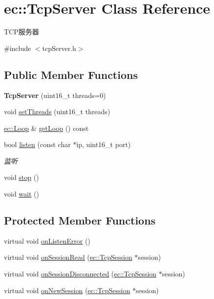 \hypertarget{classec_1_1TcpServer}{\section{ec\-:\-:Tcp\-Server Class Reference}
\label{classec_1_1TcpServer}
}


T\-C\-P服务器  




{\ttfamily \#include $<$tcp\-Server.\-h$>$}

\subsection*{Public Member Functions}
\begin{DoxyCompactItemize}
\item 
\hypertarget{classec_1_1TcpServer_acda2f66f003a4203c17886c3d70c1c77}{{\bfseries Tcp\-Server} (uint16\-\_\-t threads=0)}\label{classec_1_1TcpServer_acda2f66f003a4203c17886c3d70c1c77}

\item 
void \hyperlink{classec_1_1TcpServer_a5bb66fcd67ba08031fc65c7e2ea7220d}{set\-Threads} (uint16\-\_\-t threads)
\item 
\hyperlink{classec_1_1Loop}{ec\-::\-Loop} \& \hyperlink{classec_1_1TcpServer_a9249823c7fb037626df45335dad1c506}{get\-Loop} () const 
\item 
bool \hyperlink{classec_1_1TcpServer_a5664dc7c718dd2bd77a4f424ae49361f}{listen} (const char $\ast$ip, uint16\-\_\-t port)
\begin{DoxyCompactList}\small\item\em 监听 \end{DoxyCompactList}\item 
void \hyperlink{classec_1_1TcpServer_ad7312d86be0f2ad13d24de79c77298c3}{stop} ()
\item 
void \hyperlink{classec_1_1TcpServer_ad37edaf6e644d00b80c90610f4ca4ad5}{wait} ()
\end{DoxyCompactItemize}
\subsection*{Protected Member Functions}
\begin{DoxyCompactItemize}
\item 
virtual void \hyperlink{classec_1_1TcpServer_aa70b8c0ff54b76b78492bd02c1396d40}{on\-Listen\-Error} ()
\item 
virtual void \hyperlink{classec_1_1TcpServer_afd151d6640eda1e7de6934292d0ce045}{on\-Session\-Read} (\hyperlink{classec_1_1TcpSession}{ec\-::\-Tcp\-Session} $\ast$session)
\item 
virtual void \hyperlink{classec_1_1TcpServer_a6c6e9583952b194f6510b1d67c960682}{on\-Session\-Disconnected} (\hyperlink{classec_1_1TcpSession}{ec\-::\-Tcp\-Session} $\ast$session)
\item 
virtual void \hyperlink{classec_1_1TcpServer_a3fb6ace162987df6f7375ef08346f8f8}{on\-New\-Session} (\hyperlink{classec_1_1TcpSession}{ec\-::\-Tcp\-Session} $\ast$session)
\end{DoxyCompactItemize}
